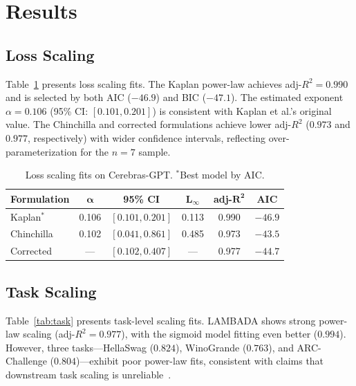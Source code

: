 \documentclass[11pt]{article}
\begin{document}
\section{Results}

\subsection{Loss Scaling}

Table~\ref{tab:loss} presents loss scaling fits. The Kaplan power-law achieves adj-$R^2 = 0.990$ and is selected by both AIC ($-46.9$) and BIC ($-47.1$). The estimated exponent $\alpha = 0.106$ (95\% CI: $[0.101, 0.201]$) is consistent with Kaplan et al.'s original value. The Chinchilla and corrected formulations achieve lower adj-$R^2$ ($0.973$ and $0.977$, respectively) with wider confidence intervals, reflecting over-parameterization for the $n=7$ sample.

\begin{table}[h]
\centering
\small
\caption{Loss scaling fits on Cerebras-GPT. $^*$Best model by AIC.}
\label{tab:loss}
\begin{tabular}{lccccc}
\toprule
\textbf{Formulation} & $\boldsymbol{\alpha}$ & \textbf{95\% CI} & $\boldsymbol{L_\infty}$ & \textbf{adj-}$\boldsymbol{R^2}$ & \textbf{AIC} \\
\midrule
Kaplan$^*$ & 0.106 & $[0.101, 0.201]$ & 0.113 & 0.990 & $-46.9$ \\
Chinchilla & 0.102 & $[0.041, 0.861]$ & 0.485 & 0.973 & $-43.5$ \\
Corrected  & ---   & $[0.102, 0.407]$ & ---   & 0.977 & $-44.7$ \\
\bottomrule
\end{tabular}
\end{table}

\subsection{Task Scaling}

Table~\ref{tab:task} presents task-level scaling fits. LAMBADA shows strong power-law scaling (adj-$R^2 = 0.977$), with the sigmoid model fitting even better ($0.994$). However, three tasks---HellaSwag ($0.824$), WinoGrande ($0.763$), and ARC-Challenge ($0.804$)---exhibit poor power-law fits, consistent with claims that downstream task scaling is unreliable~\cite{schaeffer2023emergent}.
\end{document}
